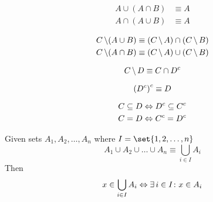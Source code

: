 \begin{definition}
\begin{align}
    A \cup (A \cap B) &\equiv A \\
    A \cap (A \cup B) &\equiv A
\end{align}
\end{definition}

\begin{definition}
\begin{align}
    C \operatorname{\backslash} (A \cup B) &\equiv (C \operatorname{\backslash} A) \cap (C \operatorname{\backslash} B) \\
    C \operatorname{\backslash} (A \cap B) &\equiv (C \operatorname{\backslash} A) \cup (C \operatorname{\backslash} B)
\end{align}
\end{definition}

\begin{definition}
\begin{equation}
    C \operatorname{\backslash} D \equiv C \cap {D}^{c}
\end{equation}
\end{definition}

\begin{definition}
\begin{equation}
    {({D}^{c})}^{c} \equiv D
\end{equation}
\end{definition}

\begin{definition}[Contraposition]
\begin{align}
    C \subseteq D &\Leftrightarrow {D}^{c} \subseteq {C}^{c} \\
    C = D &\Leftrightarrow {C}^{c} = {D}^{c}
\end{align}
\end{definition}

\begin{definition}
    Given sets $A_1, A_2, \dots, A_n$ where $I = \set{1, 2, \dots, n}$
    \begin{equation}
        A_1 \cup A_2 \cup \dots \cup A_n \equiv \bigcup_{i \in I} A_i
    \end{equation}
    Then
    \begin{equation}
        x \in \bigcup_{i \in I} A_i \Leftrightarrow \operatorname{\exists} i \in I \colon x \in A_i
    \end{equation}
\end{definition}

